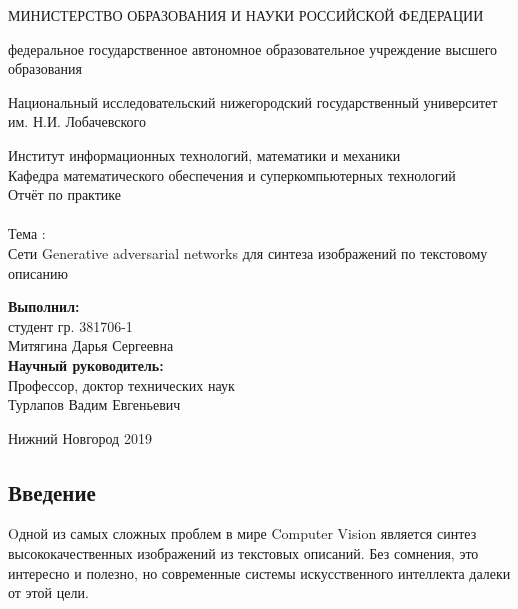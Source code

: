\documentclass{article}
\begin{document}
    \begin{center} 
    \large МИНИСТЕРСТВО ОБРАЗОВАНИЯ И НАУКИ РОССИЙСКОЙ ФЕДЕРАЦИИ

федеральное государственное автономное образовательное учреждение высшего образования

Национальный исследовательский нижегородский государственный университет им. Н.И. Лобачевского

Институт информационных технологий, математики и механики \\
Кафедра математического обеспечения и суперкомпьютерных технологий\\[3.5cm] 
    
    \huge Отчёт по практике \\[0.6cm] %
    \\ 
    \huge{Тема :}\\[0.6cm]
    \huge Сети Generative adversarial networks для синтеза изображений по текстовому описанию\\[7.7cm]
    
    
    \end{center} 
    
    \begin{flushright}
    \large \textbf{Выполнил:} \\
    студент гр. 381706-1 \\
    Митягина Дарья Сергеевна \\
    \textbf{Научный руководитель:} \\
    Профессор, доктор технических наук\\
    Турлапов Вадим Евгеньевич \\
    [3.7cm]
    \end{flushright}
    
    
    
    \begin{center} 
    \large Нижний Новгород 2019
    \end{center} 
    
    \thispagestyle{empty}
    \newpage
      \begin{center}
        \tableofcontents
      \end{center}
    \newpage
    \begin{center} 
    \section{Введение}
    \end{center} 
      \large Oдной из самых сложных проблем в мире Computer Vision является синтез высококачественных изображений из текстовых описаний. Без сомнения, это интересно и полезно, но современные системы искусственного интеллекта далеки от этой цели.
\end{document}
